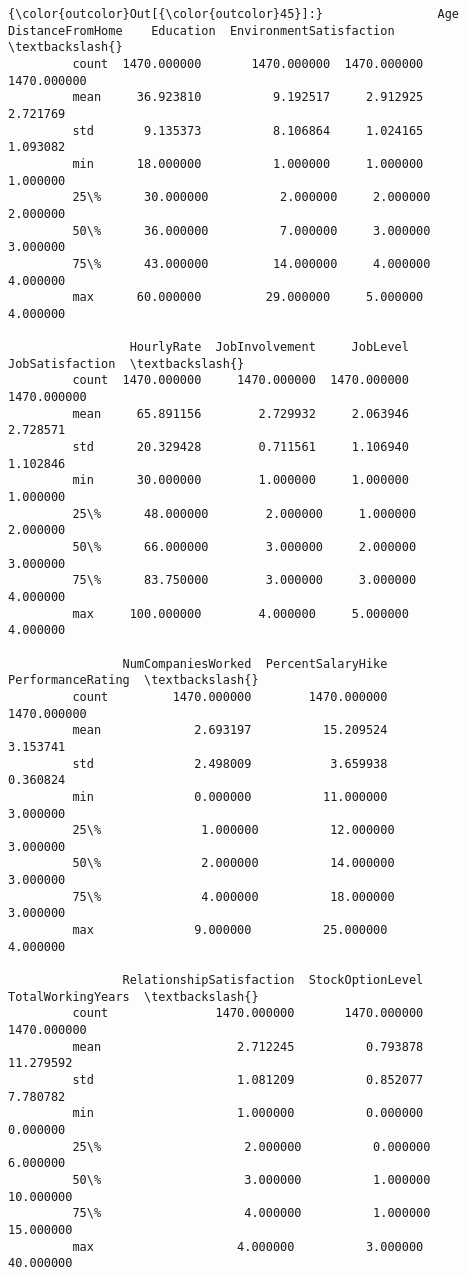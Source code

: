 \documentclass[11pt]{article}
\begin{document}
\begin{Verbatim}[commandchars=\\\{\}]
{\color{outcolor}Out[{\color{outcolor}45}]:}                Age  DistanceFromHome    Education  EnvironmentSatisfaction  \textbackslash{}
         count  1470.000000       1470.000000  1470.000000              1470.000000   
         mean     36.923810          9.192517     2.912925                 2.721769   
         std       9.135373          8.106864     1.024165                 1.093082   
         min      18.000000          1.000000     1.000000                 1.000000   
         25\%      30.000000          2.000000     2.000000                 2.000000   
         50\%      36.000000          7.000000     3.000000                 3.000000   
         75\%      43.000000         14.000000     4.000000                 4.000000   
         max      60.000000         29.000000     5.000000                 4.000000   
         
                 HourlyRate  JobInvolvement     JobLevel  JobSatisfaction  \textbackslash{}
         count  1470.000000     1470.000000  1470.000000      1470.000000   
         mean     65.891156        2.729932     2.063946         2.728571   
         std      20.329428        0.711561     1.106940         1.102846   
         min      30.000000        1.000000     1.000000         1.000000   
         25\%      48.000000        2.000000     1.000000         2.000000   
         50\%      66.000000        3.000000     2.000000         3.000000   
         75\%      83.750000        3.000000     3.000000         4.000000   
         max     100.000000        4.000000     5.000000         4.000000   
         
                NumCompaniesWorked  PercentSalaryHike  PerformanceRating  \textbackslash{}
         count         1470.000000        1470.000000        1470.000000   
         mean             2.693197          15.209524           3.153741   
         std              2.498009           3.659938           0.360824   
         min              0.000000          11.000000           3.000000   
         25\%              1.000000          12.000000           3.000000   
         50\%              2.000000          14.000000           3.000000   
         75\%              4.000000          18.000000           3.000000   
         max              9.000000          25.000000           4.000000   
         
                RelationshipSatisfaction  StockOptionLevel  TotalWorkingYears  \textbackslash{}
         count               1470.000000       1470.000000        1470.000000   
         mean                   2.712245          0.793878          11.279592   
         std                    1.081209          0.852077           7.780782   
         min                    1.000000          0.000000           0.000000   
         25\%                    2.000000          0.000000           6.000000   
         50\%                    3.000000          1.000000          10.000000   
         75\%                    4.000000          1.000000          15.000000   
         max                    4.000000          3.000000          40.000000   
         

\end{Verbatim}
\end{document}
